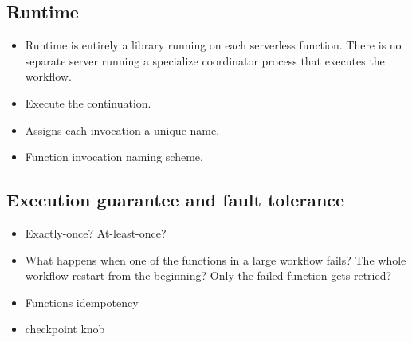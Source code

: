 \subsection{Runtime}

\begin{itemize}
	\item Runtime is entirely a library running on each serverless function. There
	is no separate server running a specialize coordinator process that
	executes the workflow.
	\item Execute the continuation.
	\item Assigns each invocation a unique name.
	\item Function invocation naming scheme.
\end{itemize}



\subsection{Execution guarantee and fault tolerance}

\begin{itemize}
	\item Exactly-once? At-least-once?
	\item What happens when one of the functions in a large workflow fails? The whole
workflow restart from the beginning? Only the failed function gets retried?
	\item Functions idempotency
	\item \name{} checkpoint knob
\end{itemize}

